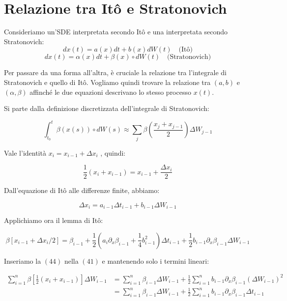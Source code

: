 \section{Relazione tra Itô e Stratonovich}
Consideriamo un'SDE interpretata secondo Itô e una interpretata secondo Stratonovich:
\begin{equation}
dx(t) = a(x)dt + b(x)dW(t) \quad \text{(Itô)}
\end{equation}
\begin{equation}
dx(t) = \alpha(x)dt + \beta(x) \circ dW(t) \quad \text{(Stratonovich)}
\end{equation}

Per passare da una forma all'altra, è cruciale la relazione tra l'integrale di Stratonovich e quello di Itô. Vogliamo quindi trovare la relazione tra $(a,b)$ e $(\alpha, \beta)$ affinché le due equazioni descrivano lo stesso processo $x(t)$.

Si parte dalla definizione discretizzata dell'integrale di Stratonovich:


\begin{equation}
\int_{t_0}^{t} \beta(x(s)) \circ dW(s) \approx \sum_{j} \beta \left(\frac{x_j+x_{j-1}}{2}\right)\Delta W_{j-1}
\end{equation}


Vale l'identità $x_i = x_{i-1} + \Delta x_i$ , quindi:


\begin{equation}
\frac{1}{2}(x_i + x_{i-1}) = x_{i-1} + \frac{\Delta x_i}{2}
\end{equation}


Dall'equazione di Itô alle differenze finite, abbiamo:


\begin{equation}
\Delta x_i = a_{i-1}\Delta t_{i-1} + b_{i-1}\Delta W_{i-1} 
\end{equation}


Applichiamo ora il lemma di Itô:


\begin{equation}
\beta[x_{i-1} + \Delta x_i/2] = \beta_{i-1} + \frac{1}{2}(a_i \partial_x \beta_{i-1} + \frac{1}{4}b_{i-1}^2)\Delta t_{i-1} + \frac{1}{2}b_{i-1}\partial_x \beta_{i-1} \Delta W_{i-1} 
\end{equation}


Inseriamo la $(44)$ nella $(41)$  e mantenendo solo i termini lineari:


\begin{align}
\sum_{i=1}^n \beta\left[\frac{1}{2}(x_i + x_{i-1})\right] \Delta W_{i-1} &= \sum_{i=1}^n \beta_{i-1} \Delta W_{i-1} + \frac{1}{2} \sum_{i=1}^n b_{i-1} \partial_x \beta_{i-1} (\Delta W_{i-1})^2 \nonumber \\
&= \sum_{i=1}^n \beta_{i-1} \Delta W_{i-1} + \frac{1}{2} \sum_{i=1}^n b_{i-1} \partial_x \beta_{i-1} \Delta t_{i-1} 
\end{align}


